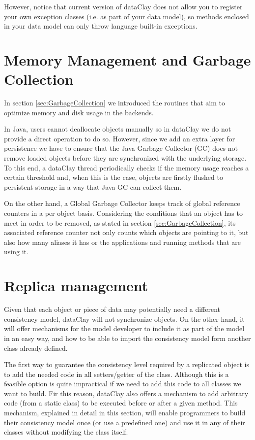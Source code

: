 However, notice that current version of dataClay does not allow you to register your own exception classes (i.e. as part of your data model), so methods enclosed in your data model can only throw language built-in exceptions.

\section {Memory Management and Garbage Collection}

In section \ref{sec:GarbageCollection} we introduced the routines that aim to optimize memory and disk usage in the backends.

In Java, users cannot deallocate objects manually so in dataClay we do not provide a direct operation to do so. However, since we add an extra layer for persistence we have to ensure that the Java Garbage Collector (GC) does not remove loaded objects before they are synchronized with the underlying storage. To this end, a dataClay thread periodically checks if the memory usage reaches a certain threshold and, when this is the case, objects are firstly flushed to persistent storage in a way that Java GC can collect them.

On the other hand, a Global Garbage Collector keeps track of global reference counters in a per object basis. Considering the conditions that an object has to meet in order to be removed, as stated in section \ref{sec:GarbageCollection}, its associated reference counter not only counts which objects are pointing to it, but also how many aliases it has or the applications and running methods that are using it.

\section{Replica management}
\label{sec:JavaReplication}

Given that each object or piece of data may potentially need a different consistency model, dataClay will not synchronize objects. On the other hand, it will offer mechanisms for the model developer to include it as part of the model in an easy way, and how to be able to import the consistency model form another class already defined.

The first way to guarantee the consistency level required by a replicated object is to add the needed code in all setters/getter of the class. Although this is a feasible option is quite impractical if we need to add this code to all classes we want to build. Fir this reason, dataClay also offers a mechanism to add arbitrary code (from a static class) to be executed before or after a given method. This mechanism, explained in detail in this section, will enable programmers to build their consistency model once (or use a predefined one) and use it in any of their classes without modifying the class itself.

